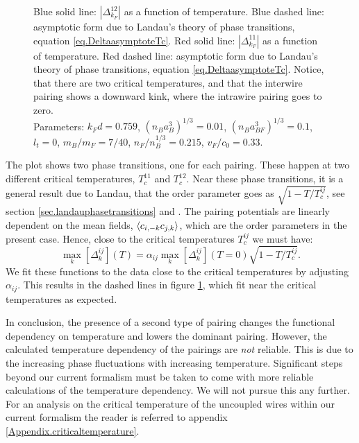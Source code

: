 \begin{figure} 
\begin{center}  
  
\caption{Blue solid line: $|\Delta^{12}_{k_F}|$ as a function of temperature. Blue dashed line: asymptotic form due to Landau's theory of phase transitions, equation \eqref{eq.DeltaasymptoteTc}. Red solid line: $|\Delta^{11}_{k_F}|$ as a function of temperature. Red dashed line: asymptotic form due to Landau's theory of phase transitions, equation \eqref{eq.DeltaasymptoteTc}. Notice, that there are two critical temperatures, and that the interwire pairing shows a downward kink, where the intrawire pairing goes to zero. \\
Parameters: $k_Fd = 0.759$, $(n_Ba_B^3)^{1/3} = 0.01$, $(n_Ba_{BF}^3)^{1/3} = 0.1$, $l_t = 0$, $m_B / m_F = 7/40$, $n_F / n_B^{1/3} = 0.215$, $v_F / c_0 = 0.33$.}  
\label{fig.maximalpairingsTdepend_2wires}  
\end{center}    
\end{figure}

The plot shows two phase transitions, one for each pairing. These happen at two different critical temperatures, $T^{11}_{c}$ and $T^{12}_{c}$. Near these phase transitions, it is a general result due to Landau, that the order parameter goes as $\sqrt{1 - T/T^{ij}_c}$, see section \ref{sec.landauphasetransitions} and \cite[86-87]{PlischkeStatPhys}. The pairing potentials are linearly dependent on the mean fields, $\braket{c_{i, -k}c_{j,k}}$, which are the order parameters in the present case. Hence, close to the critical temperatures $T^{ij}_c$ we must have:
\begin{equation}
\max_k[\Delta^{ij}_k](T) = \alpha_{ij} \max_k[\Delta^{ij}_k](T = 0) \sqrt{1 - T/T^{ij}_c}. 
\label{eq.DeltaasymptoteTc}
\end{equation}
We fit these functions to the data close to the critical temperatures by adjusting $\alpha_{ij}$. This results in the dashed lines in figure \ref{fig.maximalpairingsTdepend_2wires}, which fit near the critical temperatures as expected. 

In conclusion, the presence of a second type of pairing changes the functional dependency on temperature and lowers the dominant pairing. However, the calculated temperature dependency of the pairings are \textit{not} reliable. This is due to the increasing phase fluctuations with increasing temperature. Significant steps beyond our current formalism must be taken to come with more reliable calculations of the temperature dependency. We will not pursue this any further. For an analysis on the critical temperature of the uncoupled wires within our current formalism the reader is referred to appendix \ref{Appendix.criticaltemperature}. 

